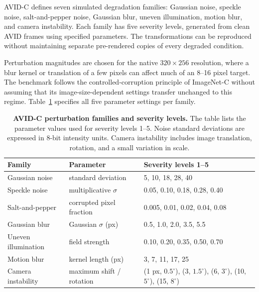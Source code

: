 \documentclass[10pt]{article}
\newcommand{\dataset}{\textsc{AVID}}
\newcommand{\corrupt}{\textsc{AVID-C}}
\begin{document}
\corrupt{} defines seven simulated degradation families: Gaussian noise, speckle noise, salt-and-pepper noise, Gaussian blur, uneven illumination, motion blur, and camera instability. Each family has five severity levels, generated from clean \dataset{} frames using specified parameters. The transformations can be reproduced without maintaining separate pre-rendered copies of every degraded condition.

Perturbation magnitudes are chosen for the native $320\times256$ resolution, where a blur kernel or translation of a few pixels can affect much of an 8--16 pixel target. The benchmark follows the controlled-corruption principle of ImageNet-C \citep{hendrycks2019benchmarking} without assuming that its image-size-dependent settings transfer unchanged to this regime. Table~\ref{tab:corruptions} specifies all five parameter settings per family.

\begin{table}[t]
\centering
\caption{\textbf{\corrupt{} perturbation families and severity levels.}
The table lists the parameter values used for severity levels 1--5. Noise standard deviations are expressed in 8-bit intensity units. Camera instability includes image translation, rotation, and a small variation in scale.}
\label{tab:corruptions}
\small
\begin{tabularx}{\linewidth}{@{}l l X@{}}
\toprule
Family & Parameter & Severity levels 1--5 \\
\midrule

Gaussian noise
& standard deviation
& 5, 10, 18, 28, 40 \\

Speckle noise
& multiplicative $\sigma$
& 0.05, 0.10, 0.18, 0.28, 0.40 \\

Salt-and-pepper
& corrupted pixel fraction
& 0.005, 0.01, 0.02, 0.04, 0.08 \\

Gaussian blur
& Gaussian $\sigma$ (px)
& 0.5, 1.0, 2.0, 3.5, 5.5 \\

Uneven illumination
& field strength
& 0.10, 0.20, 0.35, 0.50, 0.70 \\

Motion blur
& kernel length (px)
& 3, 7, 11, 17, 25 \\

Camera instability
& maximum shift / rotation
& (1 px, $0.5^\circ$), (3, $1.5^\circ$), (6, $3^\circ$),
  (10, $5^\circ$), (15, $8^\circ$) \\

\bottomrule
\end{tabularx}
\end{table}
\end{document}
